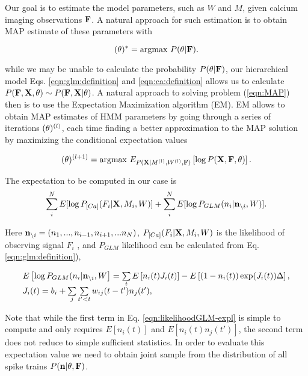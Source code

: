 Our goal is to estimate the model parameters, such as $W$ and $M$, given calcium imaging observations ${\bf F}$. A natural approach for such estimation is to obtain MAP estimate of these parameters with

\begin{equation}\label{eqn:MAP}
(\mathbf{\theta})^*=\text{argmax } P(\mathbf{\theta}|{\bf F}).
\end{equation}

while we may be unable to calculate the probability $P(\mathbf{\theta}|{\bf F})$, our hierarchical model Eqs. \eqref{eqn:glm:definition} and \eqref{eqn:ca:definition} allows us to calculate $P({\bf F}, {\bf X}, \mathbf{\theta})\sim P({\bf F}, {\bf X}|\mathbf{\theta})$. A natural approach to solving problem (\ref{eqn:MAP}) then is to use the Expectation Maximization algorithm (EM).  EM allows to obtain MAP estimates of HMM parameters by going through a series of iterations $(\mathbf{\theta})^{(l)}$, each time finding a better approximation to the MAP solution by maximizing the conditional expectation values

\begin{equation}
(\mathbf{\theta})^{(l+1)}=\text{argmax }E_{P({\bf X}|M^{(l)}, W^{(l)}, {\bf F})}\left[\log P({\bf X}, {\bf F}, \mathbf{\theta})\right].
\end{equation}

The expectation to be computed in our case is
\begin{equation}\label{eqn:loglik:definition-expl}
\sum_i^N E[\log P_{[Ca]}(F_i|{\bf X}, M_i, W)] + \sum_i^N E[\log P_{GLM}(n_i|{\bf n}_{\backslash i}, W)].
\end{equation}

Here ${\bf n}_{\backslash i}=(n_1, ..., n_{i-1}, n_{i+1}, ...n_N)$, $P_{[Ca]}(F_i|{\bf X}, M_i, W)$ is the likelihood of observing signal $F_i$ \cite{Vogelstein2009}, and $P_{GLM}$ likelihood can be calculated from Eq. \eqref{eqn:glm:definition}), 

\begin{equation}\label{eqn:likelihoodGLM-expl}
\begin{array}{l}
E\left[\log P_{GLM}(n_i|{\bf n}_{\backslash i}, W\right]=\sum\limits_t E \left[ n_i(t) J_i(t)\right] - E\left[(1-n_i(t)) \exp(J_i(t)) \Delta \right], \\
J_i(t)=b_i+\sum\limits_{j} \sum\limits_{t'<t} w_{ij}(t-t')n_{j}(t'), 
\end{array}
\end{equation}

Note that while the first term in Eq. \eqref{eqn:likelihoodGLM-expl} is simple to compute and only requires $E[n_i(t)]$ and $E[n_i(t) n_{j}(t')]$, the second term does not reduce to simple sufficient statistics. In order to evaluate this expectation value we need to obtain joint sample from the distribution of all spike trains $P({\bf n}|\mathbf{\theta}, {\bf F})$.

